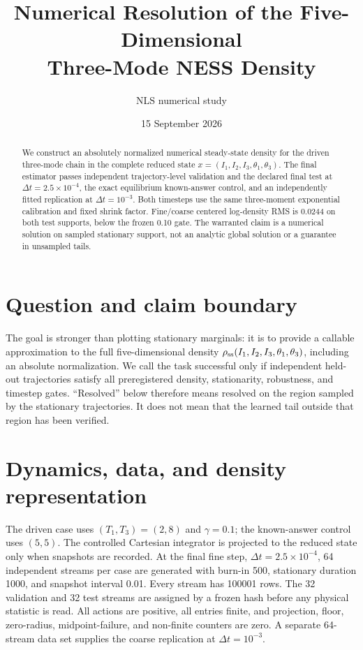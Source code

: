 \documentclass[11pt]{article}
\title{Numerical Resolution of the Five-Dimensional\\Three-Mode NESS Density}
\author{NLS numerical study}
\date{15 September 2026}
\begin{document}
\maketitle

\begin{abstract}
We construct an absolutely normalized numerical steady-state density for the
driven three-mode chain in the complete reduced state
\(x=(I_1,I_2,I_3,\theta_1,\theta_3)\).  The final estimator passes independent
trajectory-level validation and the declared final test at
\(\Delta t=2.5\times10^{-4}\),
the exact equilibrium known-answer control, and an independently fitted
replication at \(\Delta t=10^{-3}\).  Both timesteps use the same three-moment
exponential calibration and fixed shrink factor.  Fine/coarse centered
log-density RMS is 0.0244 on both test supports, below the frozen 0.10 gate.
The warranted claim
is a numerical solution on sampled stationary support, not an analytic global
solution or a guarantee in unsampled tails.
\end{abstract}

\section{Question and claim boundary}

The goal is stronger than plotting stationary marginals: it is to provide a
callable approximation to the full five-dimensional density
\(\rho_{\rm ss}(I_1,I_2,I_3,\theta_1,\theta_3)\), including an absolute
normalization.  We call the task successful only if independent held-out
trajectories satisfy all preregistered density, stationarity, robustness, and
timestep gates.  ``Resolved'' below therefore means resolved on the region
sampled by the stationary trajectories.  It does not mean that the learned
tail outside that region has been verified.

\section{Dynamics, data, and density representation}

The driven case uses \((T_1,T_3)=(2,8)\) and \(\gamma=0.1\); the known-answer
control uses \((5,5)\).  The controlled Cartesian integrator is projected to
the reduced state only when snapshots are recorded.  At the final fine step,
\(\Delta t=2.5\times10^{-4}\), 64 independent streams per case are generated
with burn-in 500, stationary duration 1000, and snapshot interval 0.01.  Every
stream has 100001 rows.  The 32 validation and 32 test streams are assigned by
a frozen hash before any physical statistic is read.  All actions are positive,
all entries finite, and projection, floor, zero-radius, midpoint-failure, and
non-finite counters are zero.  A separate 64-stream data set supplies the
coarse replication at \(\Delta t=10^{-3}\).
\end{document}
